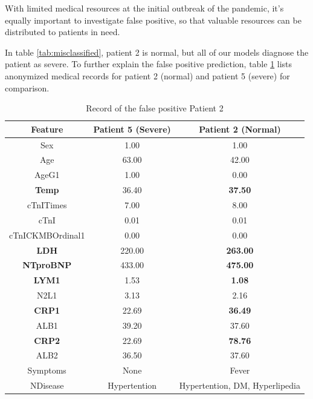 With limited medical resources at the initial outbreak of the pandemic, it's equally important to investigate false positive, so that valuable resources can be distributed to patients in need.

In table \ref{tab:misclassified}, patient 2 is normal, but all of our models diagnose the patient as severe. To further explain the false positive prediction, table \ref{tab:normal2} lists anonymized medical records for patient 2 (normal) and patient 5 (severe) for comparison.

\begin{table}[H]
\centering
\begin{tabular}{ccc}
\toprule
Feature   & Patient 5 (Severe) & Patient 2 (Normal)\\ 
\midrule
Sex                 &   1.00    &   1.00 \\
Age                 &   63.00   &   42.00 \\
AgeG1               &   1.00    &   0.00 \\
\textbf{Temp}       &   36.40   &   \textbf{37.50} \\
cTnITimes           &   7.00    &   8.00 \\
cTnI                &   0.01    &   0.01 \\
cTnICKMBOrdinal1    &  0.00     &   0.00 \\
\textbf{LDH}        &  220.00   &   \textbf{263.00} \\
\textbf{NTproBNP}   &  433.00   &   \textbf{475.00} \\
\textbf{LYM1}       &  1.53     &   \textbf{1.08} \\
N2L1                &  3.13     &   2.16 \\
\textbf{CRP1}       &  22.69    &   \textbf{36.49} \\
ALB1                &  39.20    &   37.60 \\
\textbf{CRP2}       &  22.69    &   \textbf{78.76} \\
ALB2                &  36.50    &   37.60 \\
Symptoms            &  None     &   Fever \\
NDisease            & Hypertention & Hypertention, DM, Hyperlipedia \\
\bottomrule
\end{tabular}
\caption{Record of the false positive Patient 2}
\label{tab:normal2}
\end{table}

